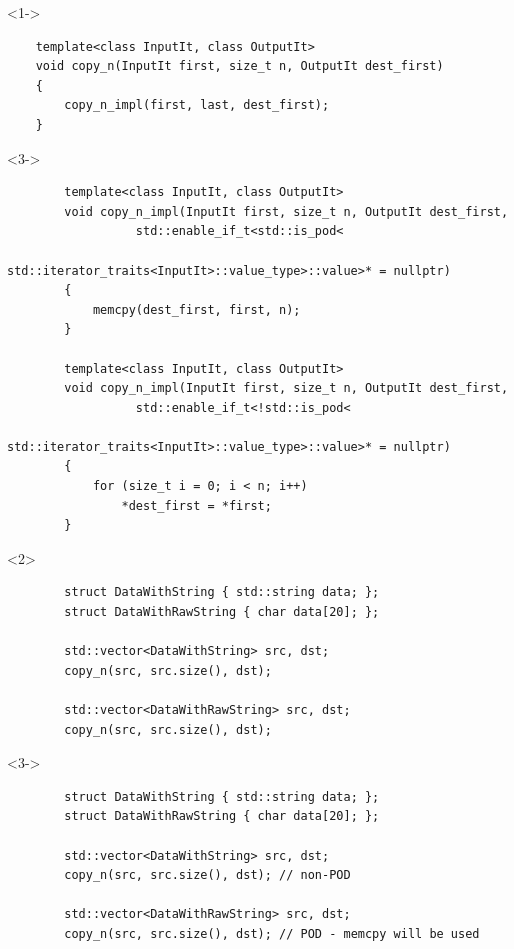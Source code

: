 \documentclass{beamer}
\begin{document}
\begin{frame}[fragile,t]
    \begin{onlyenv}<1->
    \begin{lstlisting}
    template<class InputIt, class OutputIt>
    void copy_n(InputIt first, size_t n, OutputIt dest_first)
    {
        copy_n_impl(first, last, dest_first);
    }
    \end{lstlisting}
    \end{onlyenv}

    \begin{onlyenv}<3->
    \begin{lstlisting}
        template<class InputIt, class OutputIt>
        void copy_n_impl(InputIt first, size_t n, OutputIt dest_first, 
                  std::enable_if_t<std::is_pod<
                    std::iterator_traits<InputIt>::value_type>::value>* = nullptr)
        {
            memcpy(dest_first, first, n);
        }

        template<class InputIt, class OutputIt>
        void copy_n_impl(InputIt first, size_t n, OutputIt dest_first, 
                  std::enable_if_t<!std::is_pod<
                    std::iterator_traits<InputIt>::value_type>::value>* = nullptr)
        {
            for (size_t i = 0; i < n; i++)
                *dest_first = *first;
        }
    \end{lstlisting}
    \end{onlyenv}

    \hrulefill
    
    \begin{onlyenv}<2>
    \begin{lstlisting}
        struct DataWithString { std::string data; };
        struct DataWithRawString { char data[20]; };

        std::vector<DataWithString> src, dst;
        copy_n(src, src.size(), dst);
        
        std::vector<DataWithRawString> src, dst;
        copy_n(src, src.size(), dst);

    \end{lstlisting}
    \end{onlyenv}

    \begin{onlyenv}<3->
    \begin{lstlisting}
        struct DataWithString { std::string data; };
        struct DataWithRawString { char data[20]; };

        std::vector<DataWithString> src, dst;
        copy_n(src, src.size(), dst); // non-POD
        
        std::vector<DataWithRawString> src, dst;
        copy_n(src, src.size(), dst); // POD - memcpy will be used

    \end{lstlisting}
    \end{onlyenv}
\end{frame}
\end{document}
